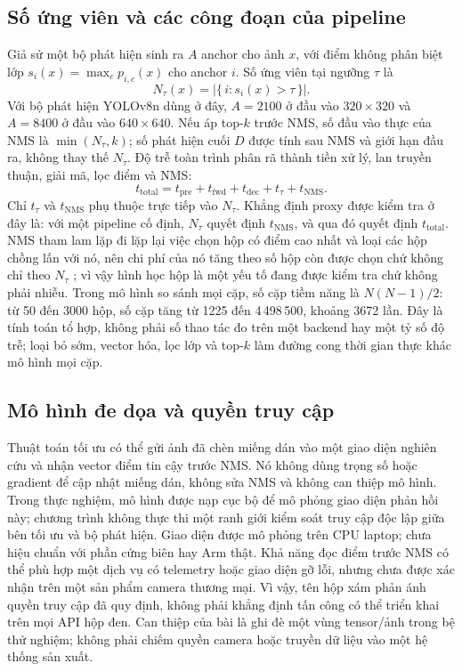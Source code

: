 \documentclass[12pt,a4paper]{article}
\newcommand{\Ntau}{N_{\tau}}
\begin{document}
\subsection{Số ứng viên và các công đoạn của pipeline}
Giả sử một bộ phát hiện sinh ra $A$ anchor cho ảnh $x$, với điểm không phân biệt lớp $s_i(x)=\max_c p_{i,c}(x)$ cho anchor $i$. Số ứng viên tại ngưỡng $\tau$ là
\begin{equation}
\Ntau(x)=\bigl|\{\, i : s_i(x) > \tau \,\}\bigr| .
\end{equation}
Với bộ phát hiện YOLOv8n dùng ở đây, $A=2100$ ở đầu vào $320\times320$ và $A=8400$ ở đầu vào $640\times640$. Nếu áp top-$k$ trước NMS, số đầu vào thực của NMS là $\min(\Ntau,k)$; số phát hiện cuối $D$ được tính sau NMS và giới hạn đầu ra, không thay thế $\Ntau$. Độ trễ toàn trình phân rã thành tiền xử lý, lan truyền thuận, giải mã, lọc điểm và NMS:
\begin{equation}
t_{\mathrm{total}} = t_{\mathrm{pre}} + t_{\mathrm{fwd}} + t_{\mathrm{dec}} + t_{\tau} + t_{\mathrm{NMS}} .
\end{equation}
Chỉ $t_{\tau}$ và $t_{\mathrm{NMS}}$ phụ thuộc trực tiếp vào $\Ntau$. Khẳng định proxy được kiểm tra ở đây là: với một pipeline cố định, $\Ntau$ quyết định $t_{\mathrm{NMS}}$, và qua đó quyết định $t_{\mathrm{total}}$. NMS tham lam lặp đi lặp lại việc chọn hộp có điểm cao nhất và loại các hộp chồng lấn với nó, nên chi phí của nó tăng theo số hộp còn được chọn chứ không chỉ theo $\Ntau$ \cite{neubeck2006nms}; vì vậy hình học hộp là một yếu tố đang được kiểm tra chứ không phải nhiễu. Trong mô hình so sánh mọi cặp, số cặp tiềm năng là $N(N-1)/2$: từ 50 đến 3000 hộp, số cặp tăng từ 1225 đến 4\,498\,500, khoảng 3672 lần. Đây là tính toán tổ hợp, không phải số thao tác đo trên một backend hay một tỷ số độ trễ; loại bỏ sớm, vector hóa, lọc lớp và top-$k$ làm đường cong thời gian thực khác mô hình mọi cặp.

\subsection{Mô hình đe dọa và quyền truy cập}
Thuật toán tối ưu có thể gửi ảnh đã chèn miếng dán vào một giao diện nghiên cứu và nhận vector điểm tin cậy trước NMS. Nó không dùng trọng số hoặc gradient để cập nhật miếng dán, không sửa NMS và không can thiệp mô hình. Trong thực nghiệm, mô hình được nạp cục bộ để mô phỏng giao diện phản hồi này; chương trình không thực thi một ranh giới kiểm soát truy cập độc lập giữa bên tối ưu và bộ phát hiện. Giao diện được mô phỏng trên CPU laptop; chưa hiệu chuẩn với phần cứng biên hay Arm thật. Khả năng đọc điểm trước NMS có thể phù hợp một dịch vụ có telemetry hoặc giao diện gỡ lỗi, nhưng chưa được xác nhận trên một sản phẩm camera thương mại. Vì vậy, tên hộp xám phản ánh quyền truy cập đã quy định, không phải khẳng định tấn công có thể triển khai trên mọi API hộp đen. Can thiệp của bài là ghi đè một vùng tensor/ảnh trong bệ thử nghiệm; không phải chiếm quyền camera hoặc truyền dữ liệu vào một hệ thống sản xuất.
\end{document}
